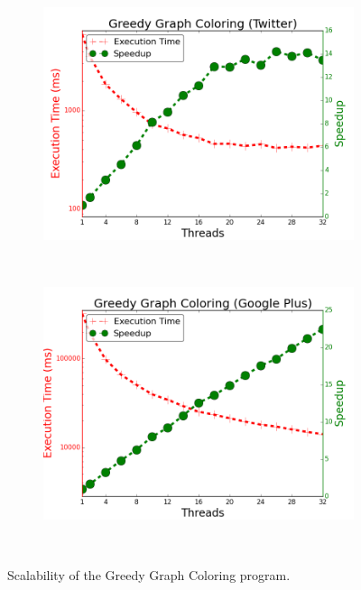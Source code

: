 \begin{figure}[]
        \begin{subfigure}[b]{\plotsize\textwidth}
                \includegraphics[width=\textwidth]{experiments/scalability/scale-greedy-graph-coloring-twitter.png}
                \label{fig:implementation:scale_ggc_twitter}
        \end{subfigure}
        ~
        \begin{subfigure}[b]{\plotsize\textwidth}
                \includegraphics[width=\textwidth]{experiments/scalability/scale-greedy-graph-coloring-gplus.png}
                \label{fig:implementation:scale_ggc_gplus}
        \end{subfigure}\\

        \caption{Scalability of the Greedy Graph Coloring program.}

        \label{fig:implementation:scale_ggc}
\end{figure}

